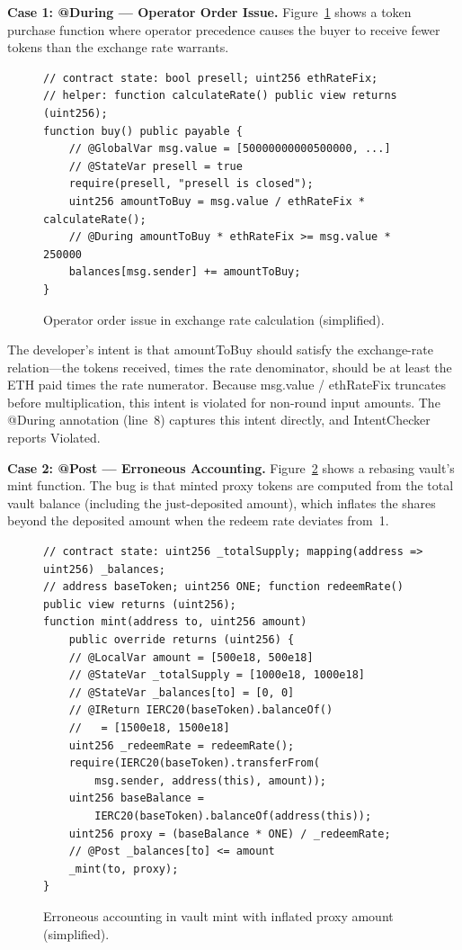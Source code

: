 \documentclass[pdflatex,sn-basic]{sn-jnl}%
\theoremstyle{thmstyleone}%
\theoremstyle{thmstyletwo}%
\theoremstyle{thmstylethree}%
\begin{document}
\smallskip
\noindent\textbf{Case 1: @During --- Operator Order Issue.}
Figure~\ref{fig:operator-order-example} shows a token purchase function where operator precedence causes the buyer to receive fewer tokens than the exchange rate warrants.

\begin{figure}[t]
\begin{lstlisting}
// contract state: bool presell; uint256 ethRateFix;
// helper: function calculateRate() public view returns (uint256);
function buy() public payable {
    // @GlobalVar msg.value = [50000000000500000, ...]
    // @StateVar presell = true
    require(presell, "presell is closed");
    uint256 amountToBuy = msg.value / ethRateFix * calculateRate();
    // @During amountToBuy * ethRateFix >= msg.value * 250000
    balances[msg.sender] += amountToBuy;
}
\end{lstlisting}
\caption{Operator order issue in exchange rate calculation (simplified).}
\label{fig:operator-order-example}
\end{figure}

The developer's intent is that amountToBuy should satisfy the exchange-rate relation---the tokens received, times the rate denominator, should be at least the ETH paid times the rate numerator.
Because msg.value / ethRateFix truncates before multiplication, this intent is violated for non-round input amounts.
The @During annotation (line~8) captures this intent directly, and IntentChecker reports Violated.

\smallskip
\noindent\textbf{Case 2: @Post --- Erroneous Accounting.}
Figure~\ref{fig:erroneous-accounting-example} shows a rebasing vault's mint function.
The bug is that minted proxy tokens are computed from the total vault balance (including the just-deposited amount), which inflates the shares beyond the deposited amount when the redeem rate deviates from~1.

\begin{figure}[t]
\begin{lstlisting}
// contract state: uint256 _totalSupply; mapping(address => uint256) _balances;
// address baseToken; uint256 ONE; function redeemRate() public view returns (uint256);
function mint(address to, uint256 amount)
    public override returns (uint256) {
    // @LocalVar amount = [500e18, 500e18]
    // @StateVar _totalSupply = [1000e18, 1000e18]
    // @StateVar _balances[to] = [0, 0]
    // @IReturn IERC20(baseToken).balanceOf()
    //   = [1500e18, 1500e18]
    uint256 _redeemRate = redeemRate();
    require(IERC20(baseToken).transferFrom(
        msg.sender, address(this), amount));
    uint256 baseBalance =
        IERC20(baseToken).balanceOf(address(this));
    uint256 proxy = (baseBalance * ONE) / _redeemRate;
    // @Post _balances[to] <= amount
    _mint(to, proxy);
}
\end{lstlisting}
\caption{Erroneous accounting in vault mint with inflated proxy amount (simplified).}
\label{fig:erroneous-accounting-example}
\end{figure}
\end{document}
